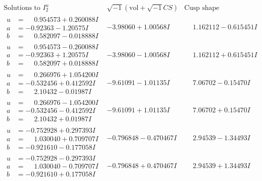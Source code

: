 \documentclass[1p]{elsarticle_modified}
\theoremstyle{definition}
\newcommand{\I}{\sqrt{-1}}
\begin{document}
$$\begin{array}{c|c|c}  
\text{Solutions to }I^u_{2}& \I (\text{vol} + \sqrt{-1}CS) & \text{Cusp shape}\\
 \hline 
\begin{aligned}
u &= \phantom{-}0.954573 + 0.260088 I \\
a &= -0.92363 - 1.20575 I \\
b &= \phantom{-}0.582097 - 0.018888 I\end{aligned}
 & -3.98060 + 1.00568 I & \phantom{-}1.162112 - 0.615451 I \\ \hline\begin{aligned}
u &= \phantom{-}0.954573 - 0.260088 I \\
a &= -0.92363 + 1.20575 I \\
b &= \phantom{-}0.582097 + 0.018888 I\end{aligned}
 & -3.98060 - 1.00568 I & \phantom{-}1.162112 + 0.615451 I \\ \hline\begin{aligned}
u &= \phantom{-}0.266976 + 1.054200 I \\
a &= -0.532456 + 0.412592 I \\
b &= \phantom{-}2.10432 - 0.01987 I\end{aligned}
 & -9.61091 - 1.01135 I & \phantom{-}7.06702 - 0.15470 I \\ \hline\begin{aligned}
u &= \phantom{-}0.266976 - 1.054200 I \\
a &= -0.532456 - 0.412592 I \\
b &= \phantom{-}2.10432 + 0.01987 I\end{aligned}
 & -9.61091 + 1.01135 I & \phantom{-}7.06702 + 0.15470 I \\ \hline\begin{aligned}
u &= -0.752928 + 0.297393 I \\
a &= \phantom{-}1.030040 + 0.709707 I \\
b &= -0.921610 - 0.177058 I\end{aligned}
 & -0.796848 - 0.470467 I & \phantom{-}2.94539 - 1.34493 I \\ \hline\begin{aligned}
u &= -0.752928 - 0.297393 I \\
a &= \phantom{-}1.030040 - 0.709707 I \\
b &= -0.921610 + 0.177058 I\end{aligned}
 & -0.796848 + 0.470467 I & \phantom{-}2.94539 + 1.34493 I \\ \hline\begin{aligned}

\end{aligned}
\end{array}$$
\end{document}
